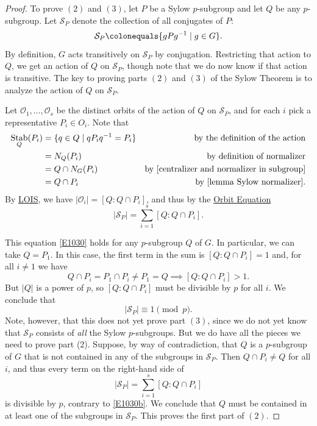 \documentclass[12pt]{report}
\numberwithin{equation}{section}
\numberwithin{theorem}{chapter}
\theoremstyle{definition}
\newtheorem*{basic properties}{Basic Properties}
\newtheorem*{Important Remark}{Important Remark}
\newcommand{\cS}{\mathcal{S}}
\DeclareMathOperator{\Stab}{Stab}
\begin{document}
\begin{proof}
To prove $(2)$ and $(3)$, let $P$ be a Sylow $p$-subgroup and let $Q$ be any $p$-subgroup. 
Let $\mathcal{S}_P$ denote the collection of all conjugates of $P$: 
$$\cS_P \colonequals \{ gPg^{-1} \mid g \in G\}.$$
By definition, $G$ acts transitively on $\cS_P$ by conjugation. Restricting that action to $Q$, we get an action of $Q$ on $\cS_P$, though note that we do now know if that action is transitive. 
The key to proving parts $(2)$ and $(3)$ of the Sylow Theorem is to analyze the action of $Q$ on $\cS_P$.

Let $\mathcal{O}_1, \dots, \mathcal{O}_s$ be the distinct orbits of the action of $Q$ on $\cS_P$, and for each $i$ pick a representative $P_i \in O_i$. Note that 
$$\begin{aligned}
\Stab_Q(P_i) & = \{q \in Q \mid qP_iq^{-1} = P_i\} & \textrm{by the definition of the action}\\
& = N_Q(P_i) & \textrm{by definition of normalizer}\\
& = Q \cap N_G(P_i) & \text{by \Cref{centralizer and normalizer in subgroup}} \\
& = Q \cap P_i & \text{by \Cref{lemma Sylow normalizer}}.	
\end{aligned}$$ 
By \hyperref[lois]{LOIS}, we have $|\mathcal{O}_i| = [Q: Q \cap P_i]$, and thus by the \hyperref[Orbit Equation]{Orbit Equation}
\begin{equation} \label{E1030}
|\cS_P |= \sum_{i=1}^s [Q: Q \cap P_i].
\end{equation}

This equation \ref{E1030} holds for any $p$-subgroup $Q$ of $G$. In particular, we can take $Q = P_1$. In this case, the first term in the sum is $[Q: Q \cap P_i] = 1$ and, for all $i \neq 1$ we have
$$Q \cap P_i = P_1 \cap P_i \neq P_1 = Q \implies [Q: Q \cap P_i] > 1.$$ 
But $|Q|$ is a power of $p$, so $[Q: Q \cap P_i]$ must be divisible by $p$ for all $i$. We conclude that
\begin{equation} \label{E1030b}
|\cS_P| \equiv 1 \pmod{p}.
\end{equation}
Note, however, that this does not yet prove part $(3)$, since we do not yet know that $\cS_P$ consists of \emph{all} the Sylow $p$-subgroups.
But we do have all the pieces we need to prove part (2). Suppose, by way of contradiction, that $Q$ is a $p$-subgroup of $G$ that is not contained in any of the subgroups in $\cS_P$. Then $Q \cap P_i \neq Q$ for all $i$, and thus every term on the right-hand side of 
$$|\cS_P |= \sum_{i=1}^s [Q: Q \cap P_i]$$
is divisible by $p$, contrary to \eqref{E1030b}. We conclude that $Q$ must be contained in at least one of the subgroups in $\cS_P$. This proves the first part of $(2)$. 


\end{proof}
\end{document}
